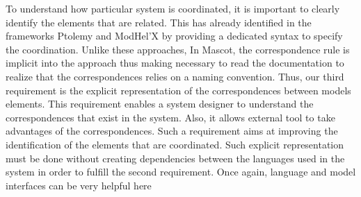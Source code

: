 



To understand how particular system is coordinated, it is important to clearly identify the elements that are related. This has already identified in the frameworks Ptolemy and ModHel'X by providing a dedicated syntax to specify the coordination. Unlike these approaches, In Mascot, the correspondence rule is implicit into the approach thus making necessary to read the documentation to realize that the correspondences relies on a naming convention. Thus, our third requirement is the explicit representation of the correspondences between models elements. This requirement enables a system designer to understand the correspondences that exist in the system. Also, it allows external tool to take advantages of the correspondences. Such a requirement aims at improving the identification of the elements that are coordinated. Such explicit representation must be done without creating dependencies between the languages used in the system in order to fulfill the second requirement. Once again, language and model interfaces can be very helpful here
	
	
